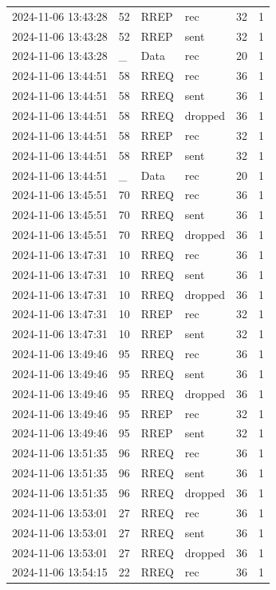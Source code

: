 \documentclass[]{nsm-thesis}
\begin{document}
\begin{longtable}{llllll}
2024-11-06 13:43:28 & 52 & RREP & rec & 32 & 1 \\
2024-11-06 13:43:28 & 52 & RREP & sent & 32 & 1 \\
2024-11-06 13:43:28 & _ & Data & rec & 20 & 1 \\
2024-11-06 13:44:51 & 58 & RREQ & rec & 36 & 1 \\
2024-11-06 13:44:51 & 58 & RREQ & sent & 36 & 1 \\
2024-11-06 13:44:51 & 58 & RREQ & dropped & 36 & 1 \\
2024-11-06 13:44:51 & 58 & RREP & rec & 32 & 1 \\
2024-11-06 13:44:51 & 58 & RREP & sent & 32 & 1 \\
2024-11-06 13:44:51 & _ & Data & rec & 20 & 1 \\
2024-11-06 13:45:51 & 70 & RREQ & rec & 36 & 1 \\
2024-11-06 13:45:51 & 70 & RREQ & sent & 36 & 1 \\
2024-11-06 13:45:51 & 70 & RREQ & dropped & 36 & 1 \\
2024-11-06 13:47:31 & 10 & RREQ & rec & 36 & 1 \\
2024-11-06 13:47:31 & 10 & RREQ & sent & 36 & 1 \\
2024-11-06 13:47:31 & 10 & RREQ & dropped & 36 & 1 \\
2024-11-06 13:47:31 & 10 & RREP & rec & 32 & 1 \\
2024-11-06 13:47:31 & 10 & RREP & sent & 32 & 1 \\
2024-11-06 13:49:46 & 95 & RREQ & rec & 36 & 1 \\
2024-11-06 13:49:46 & 95 & RREQ & sent & 36 & 1 \\
2024-11-06 13:49:46 & 95 & RREQ & dropped & 36 & 1 \\
2024-11-06 13:49:46 & 95 & RREP & rec & 32 & 1 \\
2024-11-06 13:49:46 & 95 & RREP & sent & 32 & 1 \\
2024-11-06 13:51:35 & 96 & RREQ & rec & 36 & 1 \\
2024-11-06 13:51:35 & 96 & RREQ & sent & 36 & 1 \\
2024-11-06 13:51:35 & 96 & RREQ & dropped & 36 & 1 \\
2024-11-06 13:53:01 & 27 & RREQ & rec & 36 & 1 \\
2024-11-06 13:53:01 & 27 & RREQ & sent & 36 & 1 \\
2024-11-06 13:53:01 & 27 & RREQ & dropped & 36 & 1 \\
2024-11-06 13:54:15 & 22 & RREQ & rec & 36 & 1 \\

\end{longtable}
\end{document}
